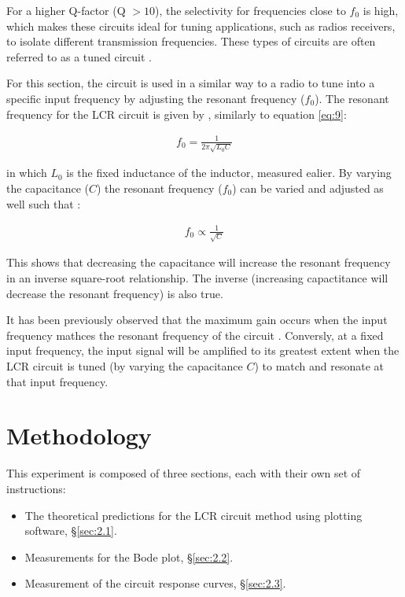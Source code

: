 \documentclass[12pt]{article}
\begin{document}
For a higher Q-factor (Q $> 10$), the selectivity for frequencies close to $f_0$ is high, which makes these circuits ideal for tuning applications, such as radios receivers, 
to isolate different transmission frequencies. These types of circuits are often referred to as a tuned circuit \cite{UCDlcr}.

For this section, the circuit is used in a similar way to a radio to tune into a specific input frequency by adjusting the resonant frequency ($f_0$).
The resonant frequency for the LCR circuit is given by \cite{UCDlcr}, similarly to equation \ref{eq:9}:

\begin{gather} \label{eq:10}
    f_0 = \frac{1}{2 \pi \sqrt{L_0C}}
\end{gather}

in which $L_0$ is the fixed inductance of the inductor, measured ealier. By varying the capacitance ($C$) the resonant frequency ($f_0$) can be varied and adjusted as well such that \cite{UCDlcr}:

\begin{gather}
    f_0 \propto \frac{1}{\sqrt{C}}
\end{gather}

This shows that decreasing the capacitance will increase the resonant frequency in an inverse square-root relationship. 
The inverse (increasing capactitance will decrease the resonant \allowbreak frequency) is also true.

It has been previously observed that the maximum gain occurs when the input frequency mathces the resonant frequency of the circuit \cite{UCDlcr}. 
Conversly, at a fixed input frequency, the input signal will be amplified to its greatest extent when the LCR circuit is tuned (by varying the capacitance $C$) to match and resonate at that input frequency.

\section{Methodology}

This experiment is composed of three sections, each with their own set of instructions:

\begin{itemize}
    \item The theoretical predictions for the LCR circuit method using plotting software, §\ref{sec:2.1}.
    \item Measurements for the Bode plot, §\ref{sec:2.2}.
    \item Measurement of the circuit response curves, §\ref{sec:2.3}.
\end{itemize}
\end{document}
